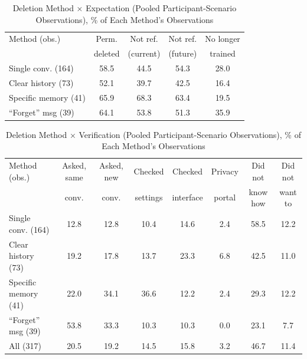 \documentclass[conference,compsoc]{IEEEtran}
\begin{document}
\begin{table}[t]
\centering
\caption{Deletion Method $\times$ Expectation (Pooled Participant-Scenario
Observations), \% of Each Method's Observations}
\label{tab:contingency}
\small
\setlength{\tabcolsep}{3pt}
\begin{tabular}{lcccc}
\toprule
Method (obs.) & Perm. & Not ref. & Not ref. & No longer \\
 & deleted & (current) & (future) & trained \\
\midrule
Single conv. (164)  & 58.5 & 44.5 & 54.3 & 28.0 \\
Clear history (73)  & 52.1 & 39.7 & 42.5 & 16.4 \\
Specific memory (41) & 65.9 & 68.3 & 63.4 & 19.5 \\
``Forget'' msg (39) & 64.1 & 53.8 & 51.3 & 35.9 \\
\bottomrule
\end{tabular}
\end{table}

\begin{table}[t]
\centering
\caption{Deletion Method $\times$ Verification (Pooled Participant-Scenario
Observations), \% of Each Method's Observations}
\label{tab:verification}
\small
\setlength{\tabcolsep}{4pt}
\begin{tabular}{lccccccc}
\toprule
Method (obs.) & Asked, same & Asked, new & Checked & Checked & Privacy & Did not & Did not \\
 & conv. & conv. & settings & interface & portal & know how & want to \\
\midrule
Single conv. (164)  & 12.8 & 12.8 & 10.4 & 14.6 & 2.4 & 58.5 & 12.2 \\
Clear history (73)  & 19.2 & 17.8 & 13.7 & 23.3 & 6.8 & 42.5 & 11.0 \\
Specific memory (41) & 22.0 & 34.1 & 36.6 & 12.2 & 2.4 & 29.3 & 12.2 \\
``Forget'' msg (39) & 53.8 & 33.3 & 10.3 & 10.3 & 0.0 & 23.1 & 7.7 \\
\midrule
All (317) & 20.5 & 19.2 & 14.5 & 15.8 & 3.2 & 46.7 & 11.4 \\
\bottomrule
\end{tabular}
\end{table}
\end{document}
